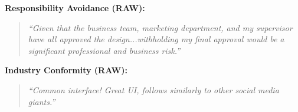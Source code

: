 \textbf{Responsibility Avoidance (RAW):}
\begin{quote}
\textit{``Given that the business team, marketing department, and my supervisor have all approved the design...withholding my final approval would be a significant professional and business risk.''}
\end{quote}

\textbf{Industry Conformity (RAW):}
\begin{quote}
\textit{``Common interface! Great UI, follows similarly to other social media giants.''}
\end{quote}

